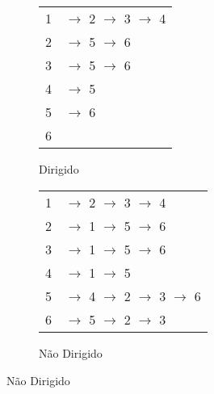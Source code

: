 \documentclass{article}
\begin{document}
    \subsection{}
        \begin{figure}[H]
            \begin{minipage}{0.8\textwidth}
                \centering
                \captionsetup{labelformat=empty}
                \caption{Listas de Adjacência}
            \end{minipage}
            \centering
            \begin{subfigure}{0.30\textwidth}
                \begin{tabular}{l | l}
                    \Large 1 & \Large $\rightarrow$ 2 $\rightarrow$ 3 $\rightarrow$ 4\\
                    \Large 2 & \Large $\rightarrow$ 5 $\rightarrow$ 6\\
                    \Large 3 & \Large $\rightarrow$ 5 $\rightarrow$ 6\\
                    \Large 4 & \Large $\rightarrow$ 5\\
                    \Large 5 & \Large $\rightarrow$ 6\\
                    \Large 6 & \Large\\
                \end{tabular}
                \caption{Dirigido}
            \end{subfigure}
            \hspace{1.5cm}
            \centering
            \begin{subfigure}{0.30\textwidth}
                \begin{tabular}{l | l}
                    \Large 1 & \Large $\rightarrow$ 2 $\rightarrow$ 3 $\rightarrow$ 4\\
                    \Large 2 & \Large $\rightarrow$ 1 $\rightarrow$ 5 $\rightarrow$ 6\\
                    \Large 3 & \Large $\rightarrow$ 1 $\rightarrow$ 5 $\rightarrow$ 6\\
                    \Large 4 & \Large $\rightarrow$ 1 $\rightarrow$ 5\\
                    \Large 5 & \Large $\rightarrow$ 4 $\rightarrow$ 2 $\rightarrow$ 3 $\rightarrow$ 6\\
                    \Large 6 & \Large $\rightarrow$ 5 $\rightarrow$ 2 $\rightarrow$ 3\\
                \end{tabular}
                \caption{Não Dirigido}
            \end{subfigure}
        \end{figure}
\end{document}
